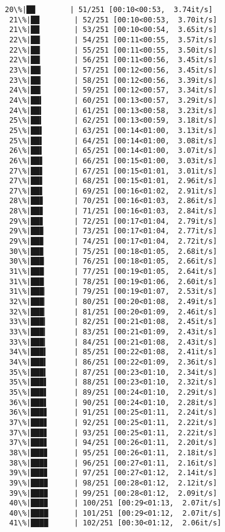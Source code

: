 \documentclass[11pt]{article}
\begin{document}
\begin{Verbatim}[commandchars=\\\{\}]
 20\%|██        | 51/251 [00:10<00:53,  3.74it/s]
 21\%|██        | 52/251 [00:10<00:53,  3.70it/s]
 21\%|██        | 53/251 [00:10<00:54,  3.65it/s]
 22\%|██▏       | 54/251 [00:11<00:55,  3.57it/s]
 22\%|██▏       | 55/251 [00:11<00:55,  3.50it/s]
 22\%|██▏       | 56/251 [00:11<00:56,  3.45it/s]
 23\%|██▎       | 57/251 [00:12<00:56,  3.45it/s]
 23\%|██▎       | 58/251 [00:12<00:56,  3.39it/s]
 24\%|██▎       | 59/251 [00:12<00:57,  3.34it/s]
 24\%|██▍       | 60/251 [00:13<00:57,  3.29it/s]
 24\%|██▍       | 61/251 [00:13<00:58,  3.23it/s]
 25\%|██▍       | 62/251 [00:13<00:59,  3.18it/s]
 25\%|██▌       | 63/251 [00:14<01:00,  3.13it/s]
 25\%|██▌       | 64/251 [00:14<01:00,  3.08it/s]
 26\%|██▌       | 65/251 [00:14<01:00,  3.07it/s]
 26\%|██▋       | 66/251 [00:15<01:00,  3.03it/s]
 27\%|██▋       | 67/251 [00:15<01:01,  3.01it/s]
 27\%|██▋       | 68/251 [00:15<01:01,  2.96it/s]
 27\%|██▋       | 69/251 [00:16<01:02,  2.91it/s]
 28\%|██▊       | 70/251 [00:16<01:03,  2.86it/s]
 28\%|██▊       | 71/251 [00:16<01:03,  2.84it/s]
 29\%|██▊       | 72/251 [00:17<01:04,  2.79it/s]
 29\%|██▉       | 73/251 [00:17<01:04,  2.77it/s]
 29\%|██▉       | 74/251 [00:17<01:04,  2.72it/s]
 30\%|██▉       | 75/251 [00:18<01:05,  2.68it/s]
 30\%|███       | 76/251 [00:18<01:05,  2.66it/s]
 31\%|███       | 77/251 [00:19<01:05,  2.64it/s]
 31\%|███       | 78/251 [00:19<01:06,  2.60it/s]
 31\%|███▏      | 79/251 [00:19<01:07,  2.53it/s]
 32\%|███▏      | 80/251 [00:20<01:08,  2.49it/s]
 32\%|███▏      | 81/251 [00:20<01:09,  2.46it/s]
 33\%|███▎      | 82/251 [00:21<01:08,  2.45it/s]
 33\%|███▎      | 83/251 [00:21<01:09,  2.43it/s]
 33\%|███▎      | 84/251 [00:21<01:08,  2.43it/s]
 34\%|███▍      | 85/251 [00:22<01:08,  2.41it/s]
 34\%|███▍      | 86/251 [00:22<01:09,  2.36it/s]
 35\%|███▍      | 87/251 [00:23<01:10,  2.34it/s]
 35\%|███▌      | 88/251 [00:23<01:10,  2.32it/s]
 35\%|███▌      | 89/251 [00:24<01:10,  2.29it/s]
 36\%|███▌      | 90/251 [00:24<01:10,  2.28it/s]
 36\%|███▋      | 91/251 [00:25<01:11,  2.24it/s]
 37\%|███▋      | 92/251 [00:25<01:11,  2.22it/s]
 37\%|███▋      | 93/251 [00:25<01:11,  2.22it/s]
 37\%|███▋      | 94/251 [00:26<01:11,  2.20it/s]
 38\%|███▊      | 95/251 [00:26<01:11,  2.18it/s]
 38\%|███▊      | 96/251 [00:27<01:11,  2.16it/s]
 39\%|███▊      | 97/251 [00:27<01:12,  2.14it/s]
 39\%|███▉      | 98/251 [00:28<01:12,  2.12it/s]
 39\%|███▉      | 99/251 [00:28<01:12,  2.09it/s]
 40\%|███▉      | 100/251 [00:29<01:13,  2.07it/s]
 40\%|████      | 101/251 [00:29<01:12,  2.07it/s]
 41\%|████      | 102/251 [00:30<01:12,  2.06it/s]

\end{Verbatim}
\end{document}
